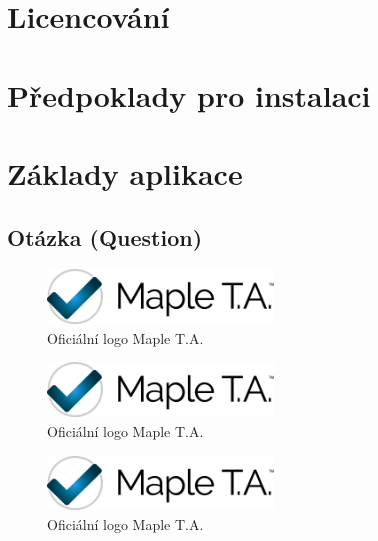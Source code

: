 \documentclass[
print,
  11pt,
  table,   
  nolof,    
  nolot,
  oneside,
  final
]{fithesis3}
\begin{document}
	\section{Licencování}
	\section{Předpoklady pro instalaci}
	\section{Základy aplikace}
		\subsection{Otázka (Question)}

		\begin{figure}
		  \begin{center}
		    \includegraphics[width=60mm]{images/MapleTA_logo.jpg}
		   \end{center}
		  \caption{Oficiální logo Maple T.A.  \cite{maple-logo}}
		  \label{fig:maplelogo}
		\end{figure}

		\begin{figure}
		  \begin{center}
		    \includegraphics[width=60mm]{images/MapleTA_logo.jpg}
		   \end{center}
		  \caption{Oficiální logo Maple T.A.  \cite{maple-logo}}
		  \label{fig:maplelogo}
		\end{figure}

		\begin{figure}
		  \begin{center}
		    \includegraphics[width=60mm]{images/MapleTA_logo.jpg}
		   \end{center}
		  \caption{Oficiální logo Maple T.A.  \cite{maple-logo}}
		  \label{fig:maplelogo}
		\end{figure}
\end{document}
